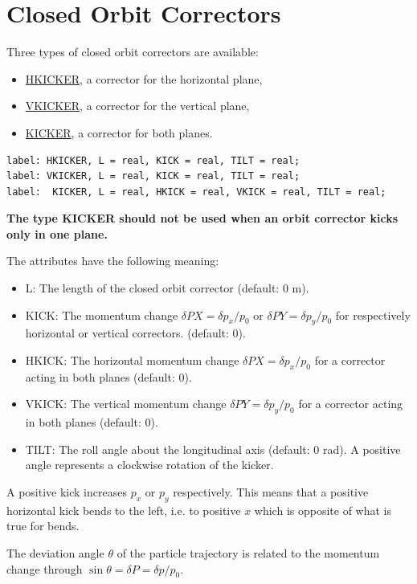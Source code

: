 \section{Closed Orbit Correctors}
\label{sec:closed_orbit_cor}
Three types of closed orbit correctors are available: 
\begin{itemize}
   \item \href{hkick}{HKICKER}, a corrector for the horizontal plane, 
   \item \href{vkick}{VKICKER}, a corrector for the vertical plane, 
   \item \href{kick}{KICKER}, a corrector for both planes. 
\end{itemize}

\begin{verbatim}
label: HKICKER, L = real, KICK = real, TILT = real;
label: VKICKER, L = real, KICK = real, TILT = real;
label:  KICKER, L = real, HKICK = real, VKICK = real, TILT = real;
\end{verbatim} 

{\bf The type KICKER should not be used when an orbit corrector kicks
  only in one plane.}  

The attributes have the following meaning: 
\begin{itemize}
   \item L: The length of the closed orbit corrector (default: 0 m). 
   \item KICK: The momentum change $\delta PX = \delta p_x/p_0$ or 
     $\delta PY = \delta p_y / p_0$ for respectively horizontal or vertical
     correctors. (default: 0).  
   \item HKICK: The horizontal momentum change 
     $\delta PX = \delta p_x/p_0$ for a corrector acting in both planes
     (default: 0).  
   \item VKICK: The vertical momentum change 
     $\delta PY = \delta p_y/p_0$  for a corrector acting in both planes
     (default: 0).  
   \item TILT: The roll angle about the longitudinal axis (default: 0
     rad). A positive angle represents a clockwise rotation of the
     kicker.  
\end{itemize} 

A positive kick increases $p_x$ or $p_y$ respectively. This
means that a positive horizontal kick bends to the left,  i.e. to
positive $x$ which is opposite of what is true for bends.    

The deviation angle $\theta$ of the particle trajectory is related to
the momentum change through  $\sin \theta = \delta P = \delta p / p_0$.

